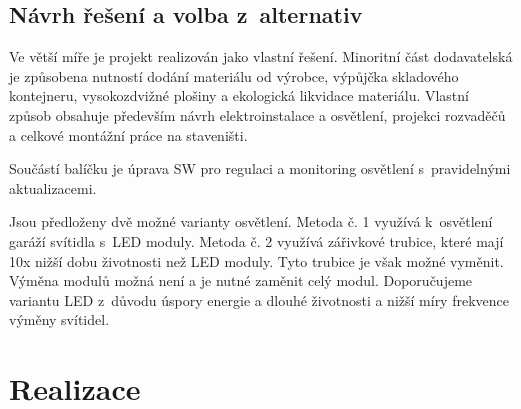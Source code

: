 \documentclass[a4paper, twoside, 11pt]{article}
\begin{document}
	\subsection{Návrh řešení a volba z~alternativ}
		Ve větší míře je projekt realizován jako vlastní řešení. Minoritní část dodavatelská je způsobena nutností dodání materiálu od výrobce, výpůjčka skladového kontejneru, vysokozdvižné plošiny a ekologická likvidace materiálu. Vlastní způsob obsahuje především návrh elektroinstalace a osvětlení, projekci rozvaděčů a celkové montážní práce na staveništi. \par
		Součástí balíčku je úprava SW pro regulaci a monitoring osvětlení s~pravidelnými aktualizacemi.\par
		Jsou předloženy dvě možné varianty osvětlení. Metoda č. 1 využívá k~osvětlení garáží svítidla s~LED moduly. Metoda č. 2 využívá zářivkové trubice, které mají 10x nižší dobu životnosti než LED moduly. Tyto trubice je však možné vyměnit. Výměna modulů možná není a je nutné zaměnit celý modul. Doporučujeme variantu LED z~důvodu úspory energie a dlouhé životnosti a nižší míry frekvence výměny svítidel.
	
\section{Realizace}
\end{document}
